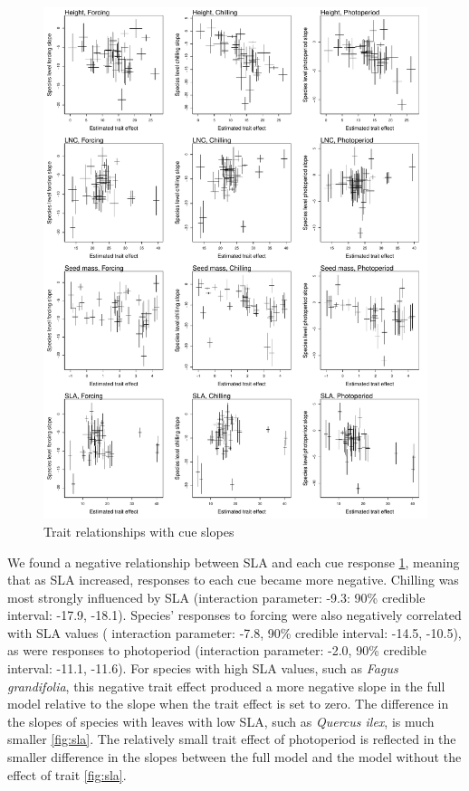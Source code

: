 \documentclass{article}\usepackage[]{graphicx}\usepackage[]{color}
\begin{document}
\begin{figure}[h!]
    \centering
 \includegraphics[width=\textwidth]{..//..//analyses/traits/figures/cuetrait.pdf} 
    \caption{Trait relationships with cue slopes}
    \label{fig:cuetraits}
\end{figure}

We found a negative relationship between SLA and each cue response  \ref{fig:cuetraits}, meaning that as SLA increased, responses to each cue became more negative. Chilling was most strongly influenced by SLA (interaction parameter: -9.3: 90\% credible interval: -17.9, -18.1). Species' responses to forcing were also negatively correlated with SLA values ( interaction parameter: -7.8, 90\% credible interval: -14.5, -10.5), as were responses to photoperiod (interaction parameter: -2.0, 90\% credible interval: -11.1, -11.6). For species with high SLA values, such as \textit{Fagus grandifolia}, this negative trait effect produced a more negative slope in the full model relative to the slope when the trait effect is set to zero. The difference in the slopes of species with leaves with low SLA, such as \textit{Quercus ilex}, is much smaller \ref{fig:sla}. The relatively small trait effect of photoperiod is reflected in the smaller difference in the slopes between the full model and the model without the effect of trait \ref{fig:sla}.
\end{document}
